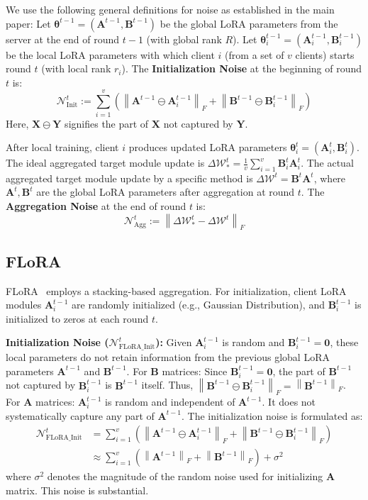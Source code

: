 \documentclass{article} %
\newcommand{\mat}[1]{\mathbf{#1}}
\begin{document}
We use the following general definitions for noise as established in the main paper:
Let $\boldsymbol{\theta}^{t-1} = (\mat{A}^{t-1}, \mat{B}^{t-1})$ be the global LoRA parameters from the server at the end of round $t-1$ (with global rank $R$).
Let $\boldsymbol{\theta}_i^{t-1} = (\mat{A}_i^{t-1}, \mat{B}_i^{t-1})$ be the local LoRA parameters with which client $i$ (from a set of $v$ clients) starts round $t$ (with local rank $r_i$).
The \textbf{Initialization Noise} at the beginning of round $t$ is:
$$\mathcal{N}_{\text{Init}}^{t} := \sum_{i=1}^{v} \left(\left\|{\mat{A}}^{t-1}\ominus {\mat{A}}_i^{t-1}\right\|_F + \left\|{\mat{B}}^{t-1}\ominus {\mat{B}}_i^{t-1}\right\|_F\right)$$
Here, $\mat{X} \ominus \mat{Y}$ signifies the part of $\mat{X}$ not captured by $\mat{Y}$.

After local training, client $i$ produces updated LoRA parameters $\boldsymbol{\theta}_i^t = (\mat{A}_i^t, \mat{B}_i^t)$.
The ideal aggregated target module update is $\Delta \boldsymbol{\mathcal{W}}_{*}^t = \frac{1}{v}\sum_{i=1}^{v} \mat{B}_i^t \mat{A}_i^t$.
The actual aggregated target module update by a specific method is $\Delta\boldsymbol{\mathcal{W}}^t=\mat{B}^t \mat{A}^t$, where $\mat{A}^t, \mat{B}^t$ are the global LoRA parameters after aggregation at round $t$.
The \textbf{Aggregation Noise} at the end of round $t$ is:
$$\mathcal{N}_{\text{Agg}}^{t} := \left\| \Delta \boldsymbol{\mathcal{W}}_{*}^t - \Delta \boldsymbol{\mathcal{W}}^t \right\|_F$$


\subsection{FLoRA} \label{appendixsubsection:flora}
FLoRA~\cite{wangflora} employs a stacking-based aggregation. For initialization, client LoRA modules $\mat{A}_i^{t-1}$ are randomly initialized (e.g., Gaussian Distribution), and $\mat{B}_i^{t-1}$ is initialized to zeros at each round $t$.

\textbf{Initialization Noise ($\mathcal{N}_{\text{FLoRA\_Init}}^{t}$):} Given $\mat{A}_i^{t-1}$ is random and $\mat{B}_i^{t-1} = \mat{0}$, these local parameters do not retain information from the previous global LoRA parameters $\mat{A}^{t-1}$ and $\mat{B}^{t-1}$. For $\mat{B}$ matrices: Since $\mat{B}_i^{t-1} = \mat{0}$, the part of $\mat{B}^{t-1}$ not captured by $\mat{B}_i^{t-1}$ is $\mat{B}^{t-1}$ itself. Thus, $\left\|{\mat{B}}^{t-1}\ominus {\mat{B}}_i^{t-1}\right\|_F = \left\|{\mat{B}}^{t-1}\right\|_F$. For $\mat{A}$ matrices: $\mat{A}_i^{t-1}$ is random and independent of $\mat{A}^{t-1}$. It does not systematically capture any part of $\mat{A}^{t-1}$. The initialization noise is formulated as:
\begin{align*}
\mathcal{N}_{\text{FLoRA\_Init}}^{t} &= \sum_{i=1}^{v} \left(\left\|{\mat{A}}^{t-1}\ominus {\mat{A}}_i^{t-1}\right\|_F + \left\|{\mat{B}}^{t-1}\ominus {\mat{B}}_i^{t-1}\right\|_F\right) \\
&\approx \sum_{i=1}^{v} \left( \left\|{\mat{A}}^{t-1}\right\|_F + \left\|{\mat{B}}^{t-1}\right\|_F \right) + \sigma^2
\end{align*}
where $\sigma^2$ denotes the magnitude of the random noise used for initializing $\mathbf{A}$ matrix. This noise is substantial.
\end{document}
